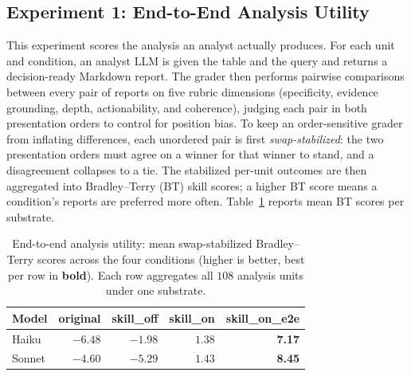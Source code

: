\subsection{Experiment 1: End-to-End Analysis Utility}
\label{subsec:exp-e2e}

This experiment scores the analysis an analyst actually produces. For each unit and condition, an analyst LLM is given the table and the query and returns a decision-ready Markdown report. The grader then performs pairwise comparisons between every pair of reports on five rubric dimensions (specificity, evidence grounding, depth, actionability, and coherence), judging each pair in both presentation orders to control for position bias. To keep an order-sensitive grader from inflating differences, each unordered pair is first \emph{swap-stabilized}: the two presentation orders must agree on a winner for that winner to stand, and a disagreement collapses to a tie. The stabilized per-unit outcomes are then aggregated into Bradley--Terry (BT) skill scores; a higher BT score means a condition's reports are preferred more often. Table~\ref{tab:e2e-bt} reports mean BT scores per substrate.

\begin{table}[t]
\centering
\caption{End-to-end analysis utility: mean swap-stabilized Bradley--Terry scores across the four conditions (higher is better, best per row in \textbf{bold}). Each row aggregates all $108$ analysis units under one substrate.}
\label{tab:e2e-bt}
\footnotesize
\begin{tabular}{lrrrr}
\toprule
Model & original & skill\_off & skill\_on & skill\_on\_e2e \\
\midrule
Haiku  & $-6.48$ & $-1.98$ & $1.38$ & \textbf{7.17} \\
Sonnet & $-4.60$ & $-5.29$ & $1.43$ & \textbf{8.45} \\
\bottomrule
\end{tabular}
\end{table}

